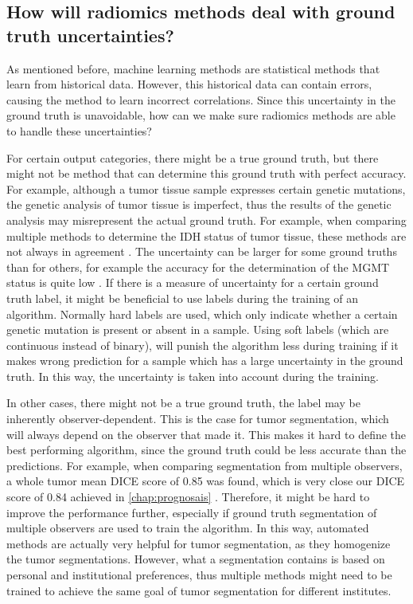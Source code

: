 \subsection{How will radiomics methods deal with ground truth uncertainties?}

As mentioned before, machine learning methods are statistical methods that learn from historical data.
However, this historical data can contain errors, causing the method to learn incorrect correlations.
Since this uncertainty in the ground truth is unavoidable, how can we make sure radiomics methods are able to handle these uncertainties?

For certain output categories, there might be a true ground truth, but there might not be method that can determine this ground truth with perfect accuracy.
For example, although a \gls{tumor} tissue sample expresses certain genetic mutations, the genetic analysis of tumor tissue is imperfect, thus the results of the genetic analysis may misrepresent the actual ground truth.
For example, when comparing multiple methods to determine the \gls{IDH} status of \gls{tumor} tissue, these methods are not always in agreement \autocite{pyo2016concordance}.
The uncertainty can be larger for some ground truths than for others, for example the accuracy for the determination of the \gls{MGMT} status is quite low \autocite{wang2017mgmt}.
If there is a measure of uncertainty for a certain ground truth label, it might be beneficial to use  labels during the training of an algorithm.
Normally hard labels are used, which only indicate whether a certain genetic mutation is present or absent in a sample.
Using soft labels (which are continuous instead of binary), will punish the algorithm less during training if it makes wrong prediction for a sample which has a large uncertainty in the ground truth.
In this way, the uncertainty is taken into account during the training.

In other cases, there might not be a true ground truth, the label may be inherently observer-dependent.
This is the case for \gls{tumor} segmentation, which will always depend on the observer that made it.
This makes it hard to define the best performing algorithm, since the ground truth could be less accurate than the predictions.
For example, when comparing segmentation from multiple observers, a whole \gls{tumor} mean DICE score of 0.85 was found, which is very close our DICE score of 0.84 achieved in \cref{chap:prognosais} \autocite{menze2015brats}.
Therefore, it might be hard to improve the performance further, especially if ground truth segmentation of multiple observers are used to train the algorithm.
In this way, automated methods are actually very helpful for \gls{tumor} segmentation, as they homogenize the \gls{tumor} segmentations.
However, what a segmentation contains is based on personal and institutional preferences, thus multiple methods might need to be trained to achieve the same goal of \gls{tumor} segmentation for different institutes.


